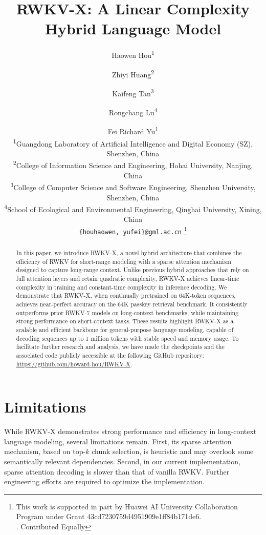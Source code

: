 \documentclass[11pt]{article}
\title{RWKV-X: A Linear Complexity Hybrid Language Model}
\author{Haowen Hou\textsuperscript{1\textdagger} 
  \and Zhiyi Huang\textsuperscript{2\textdagger} 
  \and Kaifeng Tan\textsuperscript{3}
  \and Rongchang Lu\textsuperscript{4} 
  \and Fei Richard Yu\textsuperscript{1} \\
  \textsuperscript{1}Guangdong Laboratory of Artificial Intelligence and Digital Economy (SZ), Shenzhen, China \\
  \textsuperscript{2}College of Information Science and Engineering, Hohai University, Nanjing, China\\
  \textsuperscript{3}College of Computer Science and Software Engineering, Shenzhen University, Shenzhen, China \\
  \textsuperscript{4}School of Ecological and Environmental Engineering, Qinghai University, Xining, China \\
  \texttt{\{houhaowen, yufei\}@gml.ac.cn}
  \thanks{
  This work is supported in part by Huawei AI University Collaboration Program under Grant 43cd7230759d4951909e1ff84b171de6. \\
  \textdagger. Contributed Equally
    }
  }
\begin{document}
\maketitle
\begin{abstract}
In this paper, we introduce RWKV-X, a novel hybrid architecture that combines the efficiency of RWKV for short-range modeling with a sparse attention mechanism designed to capture long-range context. 
Unlike previous hybrid approaches that rely on full attention layers and retain quadratic complexity, RWKV-X achieves linear-time complexity in training and constant-time complexity in inference decoding.
We demonstrate that RWKV-X, when continually pretrained on 64K-token sequences, achieves near-perfect accuracy on the 64K passkey retrieval benchmark. 
It consistently outperforms prior RWKV-7 models on long-context benchmarks, while maintaining strong performance on short-context tasks. These results highlight RWKV-X as a scalable and efficient backbone for general-purpose language modeling, capable of decoding sequences up to 1 million tokens with stable speed and memory usage.
To facilitate further research and analysis, we have made the checkpoints and the associated code publicly accessible at the following GitHub repository: \href{https://github.com/howard-hou/RWKV-X}{https://github.com/howard-hou/RWKV-X}.
\end{abstract}











\section*{Limitations}

While RWKV-X demonstrates strong performance and efficiency in long-context language modeling, several limitations remain. 
First, its sparse attention mechanism, based on top-$k$ chunk selection, is heuristic and may overlook some semantically relevant dependencies.
Second, in our current implementation, sparse attention decoding is slower than that of vanilla RWKV. Further engineering efforts are required to optimize the implementation.


%


\newpage
\appendix

\end{document}
